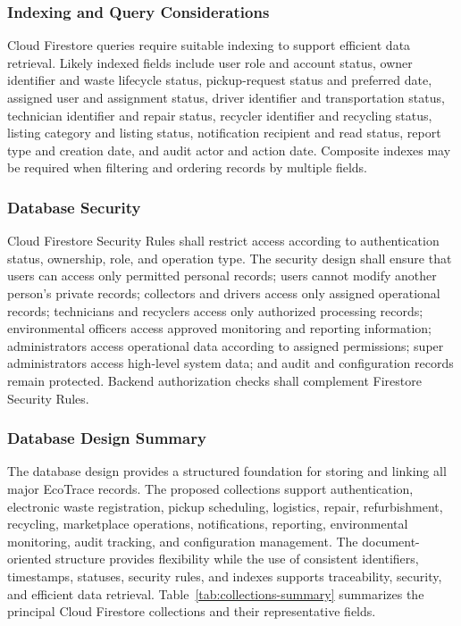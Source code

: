 \subsubsection{Indexing and Query Considerations}

Cloud Firestore queries require suitable indexing to support efficient data
retrieval. Likely indexed fields include user role and account status, owner
identifier and waste lifecycle status, pickup-request status and preferred date,
assigned user and assignment status, driver identifier and transportation
status, technician identifier and repair status, recycler identifier and recycling
status, listing category and listing status, notification recipient and read
status, report type and creation date, and audit actor and action date.
Composite indexes may be required when filtering and ordering records by
multiple fields.

\subsubsection{Database Security}

Cloud Firestore Security Rules shall restrict access according to
authentication status, ownership, role, and operation type. The security design
shall ensure that users can access only permitted personal records; users
cannot modify another person's private records; collectors and drivers access
only assigned operational records; technicians and recyclers access only
authorized processing records; environmental officers access approved
monitoring and reporting information; administrators access operational data
according to assigned permissions; super administrators access high-level
system data; and audit and configuration records remain protected. Backend
authorization checks shall complement Firestore Security Rules.

\subsubsection{Database Design Summary}

The database design provides a structured foundation for storing and
linking all major EcoTrace records. The proposed collections support
authentication, electronic waste registration, pickup scheduling, logistics,
repair, refurbishment, recycling, marketplace operations, notifications,
reporting, environmental monitoring, audit tracking, and configuration
management. The document-oriented structure provides flexibility while the
use of consistent identifiers, timestamps, statuses, security rules, and indexes
supports traceability, security, and efficient data retrieval.
Table~\ref{tab:collections-summary} summarizes the principal Cloud Firestore
collections and their representative fields.

